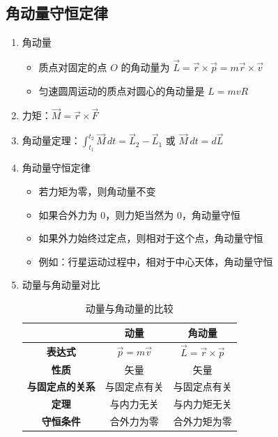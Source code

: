 \newpage
\subsection{角动量守恒定律}

\begin{enumerate}
	\item 角动量
	\begin{itemize}
		\item 质点对固定的点 $O$ 的角动量为 $\vec{L}=\vec{r}\times\vec{p}=m\vec{r}\times\vec{v}$
		\item 匀速圆周运动的质点对圆心的角动量是 $L=mvR$
	\end{itemize}
	
	\item 力矩：$\vec{M}=\vec{r}\times\vec{F}$
	
	\item 角动量定理：$\displaystyle \int_{t_1}^{t_2}\vec{M}\,dt=\vec{L}_2-\vec{L}_1$ 或 $\vec{M}\,dt=d\vec{L}$
	
	\item 角动量守恒定律
	\begin{itemize}
		\item 若力矩为零，则角动量不变
		\item 如果合外力为 $0$，则力矩当然为 $0$，角动量守恒
		\item 如果外力始终过定点，则相对于这个点，角动量守恒
		\item 例如：行星运动过程中，相对于中心天体，角动量守恒
	\end{itemize}
	
	\item 动量与角动量对比
	\begin{table}[H]
		\centering
		\caption{动量与角动量的比较}
		\begin{tabular}{ccc}
			\toprule
			& \textbf{动量} & \textbf{角动量} \\
			\midrule
			\textbf{表达式} & $\vec{p}=m\vec{v}$ & $\vec{L}=\vec{r}\times\vec{p}$ \\
			\textbf{性质} & 矢量 & 矢量 \\
			\textbf{与固定点的关系} & 与固定点有关 & 与固定点有关 \\
			\textbf{定理} & 与内力无关 & 与内力矩无关 \\
			\textbf{守恒条件} & 合外力为零 & 合外力矩为零 \\
			\bottomrule
		\end{tabular}
	\end{table}
	
\end{enumerate}

